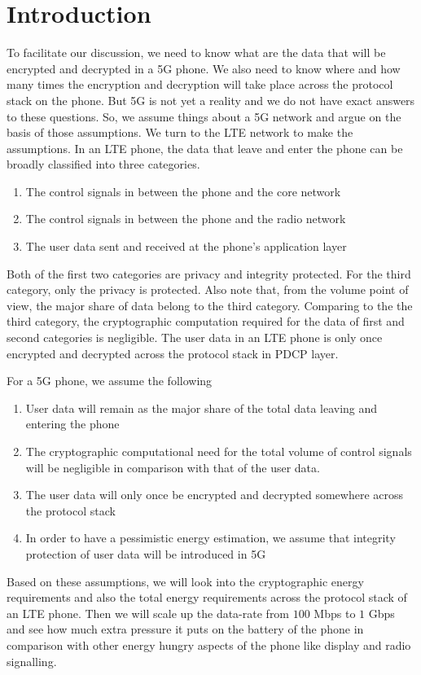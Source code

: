 \documentclass[lnicst,sechang,a4paper]{svmultln}
\begin{document}
\section{Introduction}
\label{intro} To facilitate our discussion, we need to know what are the data that will be encrypted and decrypted in a 5G phone. We also need to know where and how many times the encryption and decryption will take place across the protocol stack on the phone. But 5G is not yet a reality and we do not have exact answers to these questions. So, we assume things about a 5G network and argue on the basis of those assumptions. We turn to the LTE network to make the assumptions. In an LTE phone, the data that leave and enter the phone can be broadly classified into three categories. 
\begin{enumerate}
\item The control signals in between the phone and the core network
\item The control signals in between the phone and the radio network
\item The user data sent and received at the phone's application layer
\end{enumerate}
Both of the first two categories are privacy and integrity protected. For the third category, only the privacy is protected. Also note that, from the volume point of view, the major share of data belong to the third category. Comparing to the the third category, the cryptographic computation required for the data of first and second categories is negligible. The user data in an LTE phone is only once encrypted and decrypted across the protocol stack in PDCP layer. 

For a 5G phone, we assume the following
\begin{enumerate}
\item User data will remain as the major share of the total data leaving and entering the phone
\item The cryptographic computational need for the total volume of control signals will be negligible in comparison with that of the user data.
\item The user data will only once be encrypted and decrypted somewhere across the protocol stack
\item In order to have a pessimistic energy estimation, we assume that integrity protection of user data will be introduced in 5G
\end{enumerate}
Based on these assumptions, we will look into the cryptographic energy requirements and also the total energy requirements across the protocol stack of an LTE phone. Then we will scale up the data-rate from $100$ Mbps to $1$ Gbps and see how much extra pressure it puts on the battery of the phone in comparison with other energy hungry aspects of the phone like display and radio signalling.
\end{document}
